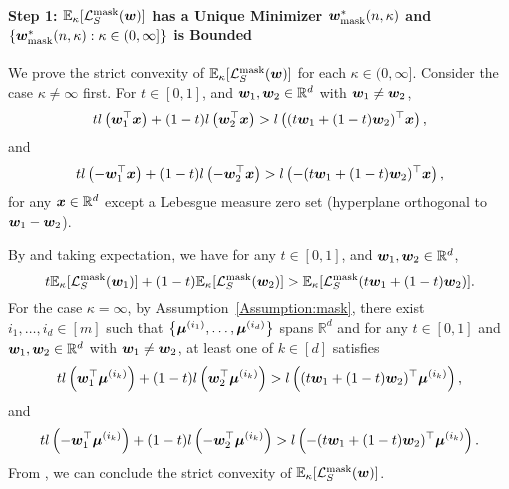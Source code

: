 \paragraph{Step 1: $\mathbb{E}_\kappa [\mathcal{L}_S^\mathrm{mask}({\bm{w}})]$ has a Unique Minimizer ${\bm{w}}^*_\mathrm{mask}(n,\kappa)$ and $\{ {\bm{w}}^*_\mathrm{mask}(n,\kappa) : \kappa \in (0, \infty]\} $ is Bounded}\quad

We prove the strict convexity of $\mathbb{E}_\kappa [\mathcal{L}_S^\mathrm{mask} ({\bm{w}})]$ for each $\kappa \in (0, \infty]$. Consider the case $\kappa \neq \infty$ first. For $t \in [0,1]$, and ${\bm{w}}_1, {\bm{w}}_2 \in \mathbb{R}^d$ with ${\bm{w}}_1 \neq {\bm{w}}_2$,
\begin{equation*}
    t l\left({\bm{w}}_1^\top {\bm{x}} \right) + (1-t) l\left({\bm{w}}_2^\top {\bm{x}}\right) >  l\left((t{\bm{w}}_1 + (1-t){\bm{w}}_2)^\top {\bm{x}}\right),
\end{equation*}
and
\begin{equation*}
    t l\left(-{\bm{w}}_1^\top {\bm{x}}\right) + (1-t) l\left(-{\bm{w}}_2^\top {\bm{x}}\right) >  l\left(-(t{\bm{w}}_1 + (1-t){\bm{w}}_2)^\top {\bm{x}}\right),
\end{equation*}
for any ${\bm{x}}\in \mathbb{R}^d$ except a Lebesgue measure zero set (hyperplane orthogonal to ${\bm{w}}_1 - {\bm{w}}_2$).

By  and taking expectation, we have for any $t \in [0,1]$, and ${\bm{w}}_1, {\bm{w}}_2 \in \mathbb{R}^d$,
\begin{equation*}
    t \mathbb{E}_\kappa[\mathcal{L}_S^\mathrm{mask}({\bm{w}}_1)] + (1-t) \mathbb{E}_\kappa[\mathcal{L}_S^\mathrm{mask}({\bm{w}}_2)] >  \mathbb{E}_\kappa[\mathcal{L}_S^\mathrm{mask}(t{\bm{w}}_1+(1-t){\bm{w}}_2)].
\end{equation*}
For the case $\kappa = \infty$, by Assumption~\ref{Assumption:mask}, there exist $i_1, \dots, i_d \in [m]$ such that $\left \{ {\bm{\mu}}^{(i_1)}, \dots, {\bm{\mu}}^{(i_d)} \right \}$ spans $\mathbb{R}^d$ and for any $t\in [0,1]$ and ${\bm{w}}_1,{\bm{w}}_2 \in \mathbb{R}^d$ with ${\bm{w}}_1 \neq {\bm{w}}_2$, at least one of $k \in [d]$ satisfies 
\begin{equation*}
    t l\left({\bm{w}}_1^\top {\bm{\mu}}^{(i_k)}\right) + (1-t) l\left({\bm{w}}_2^\top {\bm{\mu}}^{(i_k)}\right) >  l\left((t{\bm{w}}_1 + (1-t){\bm{w}}_2)^\top {\bm{\mu}}^{(i_k)}\right),
\end{equation*}
and
\begin{equation*}
    t l\left(- {\bm{w}}_1^\top {\bm{\mu}}^{(i_k)}\right) + (1-t) l\left(-{\bm{w}}_2^\top {\bm{\mu}}^{(i_k)}\right) >  l\left(-(t{\bm{w}}_1 + (1-t){\bm{w}}_2)^\top {\bm{\mu}}^{(i_k)}\right).
\end{equation*}
From , we can conclude the strict convexity of $\mathbb{E}_\kappa [\mathcal{L}_S^\mathrm{mask} ({\bm{w}})]$. 

